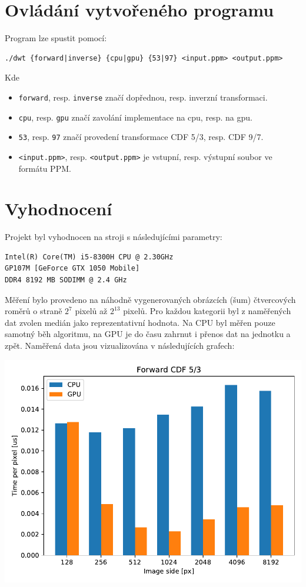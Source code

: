 \documentclass[11pt,a4paper]{article}
\begin{document}
\section{Ovládání vytvořeného programu}

Program lze spustit pomocí:
\begin{verbatim}
./dwt {forward|inverse} {cpu|gpu} {53|97} <input.ppm> <output.ppm>
\end{verbatim}
Kde
\begin{itemize}
\item \texttt{forward}, resp. \texttt{inverse} značí dopřednou, resp. inverzní transformaci.
\item \texttt{cpu}, resp. \texttt{gpu} značí zavolání implementace na cpu, resp. na gpu.
\item \texttt{53}, resp. \texttt{97} značí provedení transformace CDF 5/3, resp. CDF 9/7.
\item \texttt{<input.ppm>}, resp. \texttt{<output.ppm>} je vstupní, resp. výstupní soubor ve formátu PPM.
\end{itemize}

\section{Vyhodnocení}

Projekt byl vyhodnocen na stroji s následujícími parametry:
\begin{verbatim}
Intel(R) Core(TM) i5-8300H CPU @ 2.30GHz
GP107M [GeForce GTX 1050 Mobile]
DDR4 8192 MB SODIMM @ 2.4 GHz
\end{verbatim}

Měření bylo provedeno na náhodně vygenerovaných obrázcích (šum) čtvercových roměrů o straně $2^7$ pixelů až $2^{13}$ pixelů.
Pro každou kategorii byl z naměřených dat zvolen medián jako reprezentativní hodnota.
Na CPU byl měřen pouze samotný běh algoritmu, na GPU je do času zahrnut i přenos dat na jednotku a zpět.
Naměřená data jsou vizualizována v následujících grafech:

\includegraphics[width=.78\textwidth]{images/Forward53.pdf}
\end{document}
